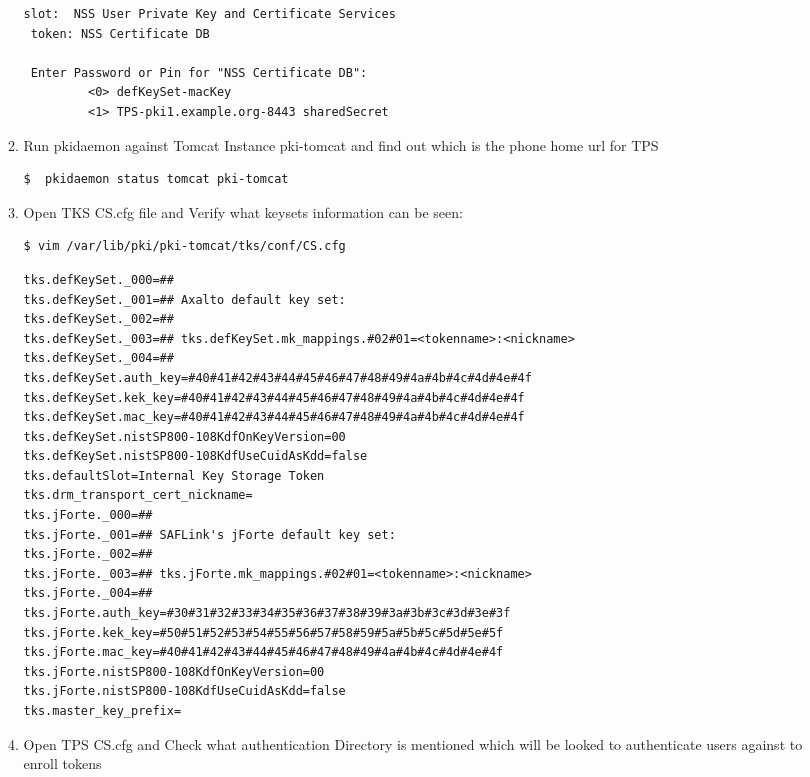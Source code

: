 \documentclass[a4paper]{article}
\begin{document}
\begin{enumerate}[label*=\arabic*.]
\begin{enumerate}[label*=\arabic*.]
\begin{lstlisting}[style=bashInputStyle]
 slot:  NSS User Private Key and Certificate Services
 token: NSS Certificate DB

 Enter Password or Pin for "NSS Certificate DB":
         <0> defKeySet-macKey
         <1> TPS-pki1.example.org-8443 sharedSecret
                    \end{lstlisting}
              \item Run pkidaemon against Tomcat Instance pki-tomcat and find out which is the phone home url for TPS
                  \begin{lstlisting}[style=bashInputStyle]
$  pkidaemon status tomcat pki-tomcat                  
                  \end{lstlisting}
               \item Open TKS CS.cfg file and Verify what keysets information can be seen:
                   \begin{lstlisting}[style=bashInputStyle]
$ vim /var/lib/pki/pki-tomcat/tks/conf/CS.cfg                   
                   \end{lstlisting}
                   \begin{lstlisting}
tks.defKeySet._000=##
tks.defKeySet._001=## Axalto default key set:
tks.defKeySet._002=##
tks.defKeySet._003=## tks.defKeySet.mk_mappings.#02#01=<tokenname>:<nickname>
tks.defKeySet._004=##
tks.defKeySet.auth_key=#40#41#42#43#44#45#46#47#48#49#4a#4b#4c#4d#4e#4f
tks.defKeySet.kek_key=#40#41#42#43#44#45#46#47#48#49#4a#4b#4c#4d#4e#4f
tks.defKeySet.mac_key=#40#41#42#43#44#45#46#47#48#49#4a#4b#4c#4d#4e#4f
tks.defKeySet.nistSP800-108KdfOnKeyVersion=00
tks.defKeySet.nistSP800-108KdfUseCuidAsKdd=false
tks.defaultSlot=Internal Key Storage Token
tks.drm_transport_cert_nickname=
tks.jForte._000=##
tks.jForte._001=## SAFLink's jForte default key set:
tks.jForte._002=##
tks.jForte._003=## tks.jForte.mk_mappings.#02#01=<tokenname>:<nickname>
tks.jForte._004=##
tks.jForte.auth_key=#30#31#32#33#34#35#36#37#38#39#3a#3b#3c#3d#3e#3f
tks.jForte.kek_key=#50#51#52#53#54#55#56#57#58#59#5a#5b#5c#5d#5e#5f
tks.jForte.mac_key=#40#41#42#43#44#45#46#47#48#49#4a#4b#4c#4d#4e#4f
tks.jForte.nistSP800-108KdfOnKeyVersion=00
tks.jForte.nistSP800-108KdfUseCuidAsKdd=false
tks.master_key_prefix=
                   \end{lstlisting}
                \item Open TPS CS.cfg and Check what authentication Directory is mentioned which 
                    will be looked to authenticate users against to enroll tokens
                    \begin{lstlisting}[style=bashInputStyle]

\end{lstlisting}
\end{enumerate}
\end{enumerate}
\end{document}
